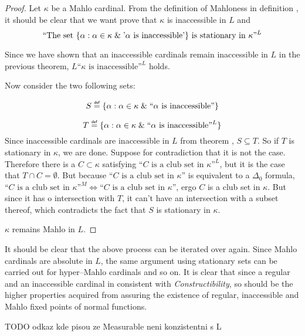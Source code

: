 \begin{proof}
Let $\kappa$ be a Mahlo cardinal. From the definition of Mahloness in definition , it should be clear that we want prove that $\kappa$ is inaccessible in $L$ and 
\begin{equation}
\mbox{``The set }\{\alpha : \alpha \in \kappa \mathrel{\&} \mbox{'$\alpha$ is inaccessible'}\}\mbox{ is stationary in $\kappa$''}^L
\end{equation}

Since we have shown that an inaccessible cardinals remain inaccessible in $L$ in the previous theorem, $L\mbox{``$\kappa$ is inaccessible''}^L$ holds.

Now consider the two following sets:
\bce[(i)]
\item \begin{equation}
S \defeq \{\alpha : \alpha \in \kappa \et \mbox{``$\alpha$ is inaccessible''}\}
\end{equation}
\item \begin{equation}
T \defeq \{\alpha : \alpha \in \kappa \et \mbox{``$\alpha$ is inaccessible''}^L\}
\end{equation} 
\ece 
Since inaccessible cardinals are inaccessible in $L$ from theorem , $S \subseteq T$.
So if $T$ is stationary in $\kappa$, we are done. Suppose for contradiction that it is not the case. 
Therefore there is a $C \subset \kappa$ satisfying $\mbox{``$C$ is a club set in $\kappa$''}^L$, but it is the case that $T \cap C = \emptyset$.
But because $\mbox{``$C$ is a club set in $\kappa$''}$ is equivalent to a $\Delta_0$ formula, $\mbox{``$C$ is a club set in $\kappa$''}^M \iff \mbox{``$C$ is a club set in $\kappa$''}$, ergo $C$ is a club set in $\kappa$. But since it has o intersection with $T$, it can't have an intersection with a subset thereof, which contradicts the fact that $S$ is stationary in $\kappa$.

$\kappa$ remains Mahlo in $L$.
\end{proof}

It should be clear that the above process can be iterated over again. Since Mahlo cardinals are absolute in $L$, the same argument using stationary sets can be carried out for hyper–Mahlo cardinals and so on. It is clear that since a regular and an inaccessible cardinal in consistent with \emph{Constructibility}, so should be the higher properties acquired from assuring the existence of regular, inaccessible and Mahlo fixed points of normal functions.

TODO odkaz kde pisou ze Measurable neni konzistentni s L
